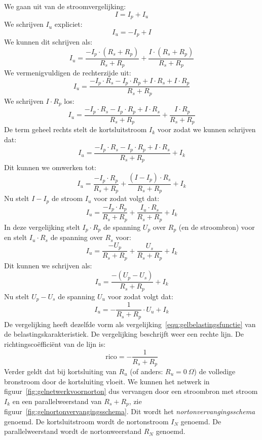 We gaan uit van de stroomvergelijking:
%
\begin{equation}
I = I_p + I_u
\end{equation}
%
We schrijven $I_u$ expliciet:
%
\begin{equation}
I_u = -I_p + I
\end{equation}
%
We kunnen dit schrijven als:
%
\begin{equation}
I_u = \dfrac{-I_p\cdot(R_s+R_p)}{R_s+R_p} + \dfrac{I\cdot(R_s+R_p)}{R_s+R_p}
\end{equation}
%
We vermenigvuldigen de rechterzijde uit:
%
\begin{equation}
I_u = \dfrac{-I_p\cdot R_s -I_p\cdot R_p + I\cdot R_s + I\cdot R_p}{R_s+R_p}
\end{equation}
%
We schrijven $I\cdot R_p$ los:
%
\begin{equation}
I_u = \dfrac{-I_p\cdot R_s -I_p\cdot R_p + I\cdot R_s}{R_s+R_p} + \dfrac{I\cdot R_p}{R_s+R_p}
\end{equation}
%
De term geheel rechts stelt de kortsluitstroom $I_k$ voor zodat we kunnen schrijven dat:
%
\begin{equation}
I_u = \dfrac{-I_p\cdot R_s -I_p\cdot R_p + I\cdot R_s}{R_s+R_p} + I_k
\end{equation}
%
Dit kunnen we omwerken tot:
%
\begin{equation}
I_u = \dfrac{-I_p\cdot R_p}{R_s+R_p} + \dfrac{(I-I_p)\cdot R_s}{R_s+R_p} + I_k
\end{equation}
%
Nu stelt $I-I_p$ de stroom $I_u$ voor zodat volgt dat:
%
\begin{equation}
I_u = \dfrac{-I_p\cdot R_p}{R_s+R_p} + \dfrac{I_u\cdot R_s}{R_s+R_p} + I_k
\end{equation}
%
In deze vergelijking stelt $I_p\cdot R_p$ de spanning $U_p$ over $R_p$ (en de stroombron) voor en
stelt $I_u\cdot R_s$ de spanning over $R_s$ voor:
%
\begin{equation}
I_u = \dfrac{-U_p}{R_s+R_p} + \dfrac{U_s}{R_s+R_p} + I_k
\end{equation}
%
Dit kunnen we schrijven als:
\begin{equation}
I_u = \dfrac{-(U_p-U_s)}{R_s+R_p} + I_k
\end{equation}
%
Nu stelt $U_p-U_s$ de spanning $U_u$ voor zodat volgt dat:
%
\begin{equation}
I_u = -\dfrac{1}{R_s+R_p}\cdot U_u + I_k
\end{equation}
%
De vergelijking heeft dezelfde vorm als vergelijking~\eqref{equ:gelbelastingsfunctie} van de belastingskarakteristiek.
De vergelijking beschrijft weer een rechte lijn. De richtingsco\"effici\"ent van de lijn is:
%
\begin{equation}
\text{rico} = -\dfrac{1}{R_s+R_p}
\end{equation}
%
Verder geldt dat bij kortsluiting van $R_u$ (of anders: $R_u = 0\ \Omega$) de volledige bronstroom door
de kortsluiting vloeit. We kunnen het netwerk in figuur~\ref{fig:gelnetwerkvoornorton} dus vervangen door
een stroombron met stroom $I_k$ en een parallelweerstand van $R_s+R_p$, zie
figuur~\ref{fig:gelnortonvervangingsschema}. Dit wordt het \textsl{nortonvervangingsschema} genoemd. De
kortsluitstroom wordt de nortonstroom $I_N$ genoemd. De parallelweerstand wordt de nortonweerstand $R_N$
genoemd. 

